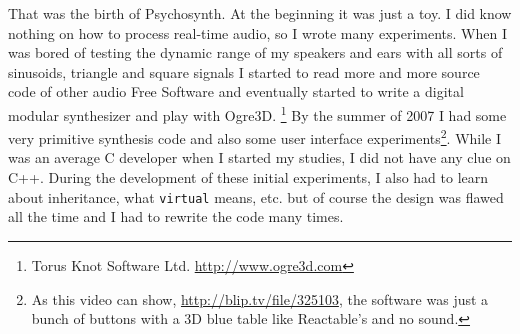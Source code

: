 That was the birth of Psychosynth. At the beginning it was just a
toy. I did know nothing on how to process real-time audio, so I wrote
many experiments. When I was bored of testing the dynamic range of my
speakers and ears with all sorts of sinusoids, triangle and square
signals I started to read more and more source code of other audio
Free Software and eventually started to write a digital modular
synthesizer and play with Ogre3D. %
\footnote{Torus Knot Software Ltd. \url{http://www.ogre3d.com}} By the
summer of 2007 I had some very primitive synthesis code and also some
user interface experiments\footnote{As this video can show,
  \url{http://blip.tv/file/325103}, the software was just a bunch of
  buttons with a 3D blue table like Reactable's and no sound.}. While
I was an average C developer when I started my studies, I did not have
any clue on C++. During the development of these initial experiments,
I also had to learn about inheritance, what \texttt{virtual} means,
etc. but of course the design was flawed all the time and I had to
rewrite the code many times.

